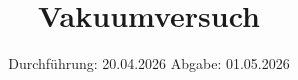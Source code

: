 

\subject{v70}
\title{Vakuumversuch}
\date{%
  Durchführung: 20.04.2026
  \hspace{3em}
  Abgabe: 01.05.2026
}



\maketitle
\thispagestyle{empty}
\tableofcontents
\newpage






\printbibliography{}


